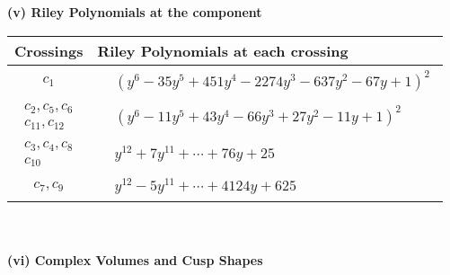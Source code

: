 \documentclass[1p]{elsarticle_modified}
\theoremstyle{definition}
\begin{document}
\newpage\renewcommand{\arraystretch}{1}
\flushleft \textbf{(v) Riley Polynomials at the component}\newline \\
\begin{tabular}{m{50pt}|m{274pt}}
Crossings & \hspace{64pt}Riley Polynomials at each crossing \\
\hline $$\begin{aligned}c_{1}\end{aligned}$$&$\begin{aligned}
&(y^6-35 y^5+451 y^4-2274 y^3-637 y^2-67 y+1)^2
\end{aligned}$\\
\hline $$\begin{aligned}c_{2},c_{5},c_{6}\\c_{11},c_{12}\end{aligned}$$&$\begin{aligned}
&(y^6-11 y^5+43 y^4-66 y^3+27 y^2-11 y+1)^2
\end{aligned}$\\
\hline $$\begin{aligned}c_{3},c_{4},c_{8}\\c_{10}\end{aligned}$$&$\begin{aligned}
&y^{12}+7 y^{11}+\cdots+76 y+25
\end{aligned}$\\
\hline $$\begin{aligned}c_{7},c_{9}\end{aligned}$$&$\begin{aligned}
&y^{12}-5 y^{11}+\cdots+4124 y+625
\end{aligned}$\\
\hline
\end{tabular}\\~\\
\newpage\flushleft \textbf{(vi) Complex Volumes and Cusp Shapes}
\end{document}
